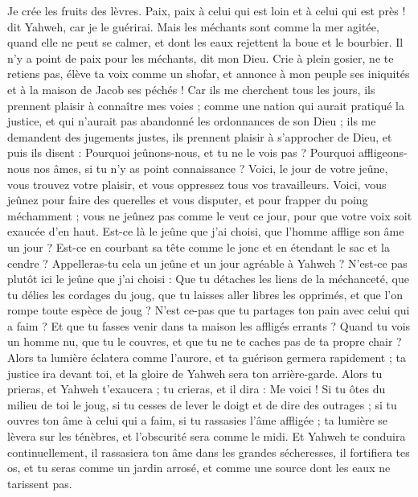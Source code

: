 \begin{multicols}{2}
Je crée les fruits des lèvres. Paix, paix à celui qui est loin et à celui qui est près ! dit Yahweh, car je le guérirai.
Mais les méchants sont comme la mer agitée, quand elle ne peut se calmer, et dont les eaux rejettent la boue et le bourbier.
Il n'y a point de paix pour les méchants, dit mon Dieu.
\VerseOne{}Crie à plein gosier, ne te retiens pas, élève ta voix comme un shofar, et annonce à mon peuple ses iniquités et à la maison de Jacob ses péchés !
Car ils me cherchent tous les jours, ils prennent plaisir à connaître mes voies ; comme une nation qui aurait pratiqué la justice, et qui n'aurait pas abandonné les ordonnances de son Dieu ; ils me demandent des jugements justes, ils prennent plaisir à s'approcher de Dieu, et puis ils disent :
Pourquoi jeûnons-nous, et tu ne le vois pas ? Pourquoi affligeons-nous nos âmes, si tu n'y as point connaissance ? Voici, le jour de votre jeûne, vous trouvez votre plaisir, et vous oppressez tous vos travailleurs.
Voici, vous jeûnez pour faire des querelles et vous disputer, et pour frapper du poing méchamment ; vous ne jeûnez pas comme le veut ce jour, pour que votre voix soit exaucée d'en haut.
Est-ce là le jeûne que j'ai choisi, que l'homme afflige son âme un jour ? Est-ce en courbant sa tête comme le jonc et en étendant le sac et la cendre ? Appelleras-tu cela un jeûne et un jour agréable à Yahweh ?
N'est-ce pas plutôt ici le jeûne que j'ai choisi : Que tu détaches les liens de la méchanceté, que tu délies les cordages du joug, que tu laisses aller libres les opprimés, et que l'on rompe toute espèce de joug ?
N'est ce-pas que tu partages ton pain avec celui qui a faim ? Et que tu fasses venir dans ta maison les affligés errants ? Quand tu vois un homme nu, que tu le couvres, et que tu ne te caches pas de ta propre chair ?
Alors ta lumière éclatera comme l'aurore, et ta guérison germera rapidement ; ta justice ira devant toi, et la gloire de Yahweh sera ton arrière-garde.
Alors tu prieras, et Yahweh t'exaucera ; tu crieras, et il dira : Me voici ! Si tu ôtes du milieu de toi le joug, si tu cesses de lever le doigt et de dire des outrages ;
si tu ouvres ton âme à celui qui a faim, si tu rassasies l'âme affligée ; ta lumière se lèvera sur les ténèbres, et l'obscurité sera comme le midi.
Et Yahweh te conduira continuellement, il rassasiera ton âme dans les grandes sécheresses, il fortifiera tes os, et tu seras comme un jardin arrosé, et comme une source dont les eaux ne tarissent pas.

\end{multicols}

